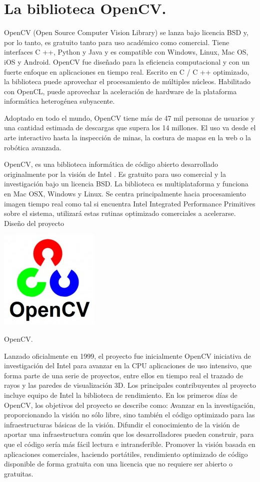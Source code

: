 \section{La biblioteca OpenCV.}

OpenCV (Open Source Computer Vision Library) se lanza bajo licencia BSD y, por lo tanto, es gratuito tanto para uso académico como comercial. Tiene interfaces C ++, Python y Java y es compatible con Windows, Linux, Mac OS, iOS y Android. OpenCV fue diseñado para la eficiencia computacional y con un fuerte enfoque en aplicaciones en tiempo real. Escrito en C / C ++ optimizado, la biblioteca puede aprovechar el procesamiento de múltiples núcleos. Habilitado con OpenCL, puede aprovechar la aceleración de hardware de la plataforma informática heterogénea subyacente.

Adoptado en todo el mundo, OpenCV tiene más de 47 mil personas de usuarios y una cantidad estimada de descargas que supera los 14 millones. El uso va desde el arte interactivo hasta la inspección de minas, la costura de mapas en la web o la robótica avanzada. \cite{OpenCVWebSite}


OpenCV, es una biblioteca informática de código abierto desarrollado originalmente por la visión de Intel . Es gratuito para uso comercial y la investigación bajo un licencia BSD. La biblioteca es multiplataforma y funciona en Mac OSX, Windows y Linux. Se centra principalmente hacia procesamiento imagen tiempo real como tal si encuentra Intel Integrated Performance Primitives sobre el sistema, utilizará estas rutinas optimizado comerciales a acelerarse.
Diseño del proyecto

\includegraphics[scale=1]{FotosPaginasWebHeliostatos/unnamed (9).jpg}

OpenCV.

Lanzado oficialmente en 1999, el proyecto fue inicialmente OpenCV iniciativa de investigación del Intel para avanzar en la CPU aplicaciones de uso intensivo, que forma parte de una serie de proyectos, entre ellos en tiempo real el trazado de rayos y las paredes de visualización 3D. Los principales contribuyentes al proyecto incluye equipo de Intel la biblioteca de rendimiento. En los primeros días de OpenCV, los objetivos del proyecto se describe como:
Avanzar en la investigación, proporcionando la visión no sólo libre, sino también el código optimizado para las infraestructuras básicas de la visión.
Difundir el conocimiento de la visión de aportar una infraestructura común que los desarrolladores pueden construir, para que el código sería más fácil lectura e intransferible.
Promover la visión basada en aplicaciones comerciales, haciendo portátiles, rendimiento optimizado de código disponible de forma gratuita con una licencia que no requiere ser abierto o gratuitas.

